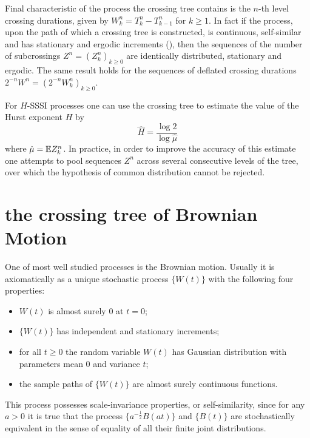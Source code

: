 Final characteristic of the process the crossing tree contains is the $n$-th level
crossing durations, given by $W_k^n = T_k^n - T_{k-1}^n$ for $k\geq1$. In fact if
the process, upon the path of which a crossing tree is constructed, is continuous,
self-similar and has stationary and ergodic increments (\cite{jonesshen2005}), then
the sequences of the number of subcrossings $Z^n = (Z_k^n)_{k\geq 0}$ are identically
distributed, stationary and ergodic. The same result holds for the sequences of deflated
crossing durations $2^{-n} W^n = (2^{-n} W_k^n)_{k\geq0}$.

For $H$-SSSI processes one can use the crossing tree to estimate the value of the
Hurst exponent $H$ by
\[ \hat{H} = \frac{\log 2}{\log \hat{\mu}} \]
where $\hat{\mu} = \mathbb{E} Z_k^n$. In practice, in order to improve the accuracy of
this estimate one attempts to pool sequences $Z^n$ across several consecutive levels
of the tree, over which the hypothesis of common distribution cannot be rejected.


\section{the crossing tree of Brownian Motion} %
\label{sec:the_crossing_tree_of_brownian_motion}

One of most well studied processes is the Brownian motion. Usually it is axiomatically
as a unique stochastic process $\bigl\{W(t)\bigr\}$ with the following four properties:
\begin{itemize}
    \item $W(t)$ is almost surely $0$ at $t=0$;
    \item $\{W(t)\}$ has independent and stationary increments;
    \item for all $t\geq 0$ the random variable $W(t)$ has Gaussian distribution with
    parameters mean $0$ and variance $t$;
    \item the sample paths of $\{W(t)\}$ are almost surely continuous functions.
\end{itemize}
This process possesses scale-invariance properties, or self-similarity, since for any
$a>0$ it is true that the process $\bigl\{a^{-\tfrac{1}{2}} B(at)\bigr\}$ and $\{B(t)\}$
are stochastically equivalent in the sense of equality of all their finite joint
distributions.

